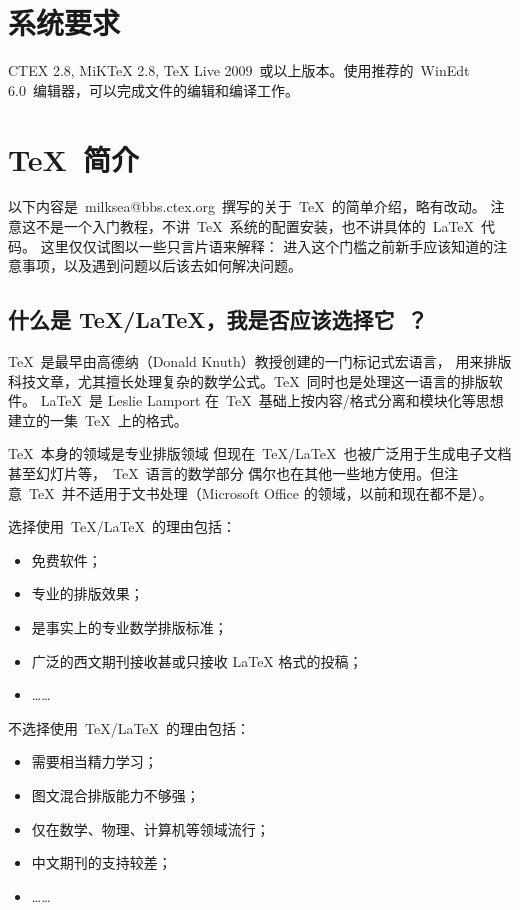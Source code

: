 \section{系统要求}
    CTEX 2.8, MiKTeX 2.8, TeX Live 2009~或以上版本。使用推荐的~WinEdt 6.0~编辑器，可以完成文件的编辑和编译工作。

\section{\TeX~简介}

以下内容是~milksea@bbs.ctex.org~撰写的关于~\TeX~的简单介绍，略有改动。
注意这不是一个入门教程，不讲~\TeX~系统的配置安装，也不讲具体的~\LaTeX~代码。
这里仅仅试图以一些只言片语来解释：
进入这个门槛之前新手应该知道的注意事项，以及遇到问题以后该去如何解决问题。

\subsection{什么是 \TeX/\LaTeX，我是否应该选择它~？}

\TeX~是最早由高德纳（Donald Knuth）教授创建的一门标记式宏语言，
用来排版科技文章，尤其擅长处理复杂的数学公式。\TeX~同时也是处理这一语言的排版软件。
\LaTeX~是 Leslie Lamport 在~\TeX~基础上按内容/格式分离和模块化等思想建立的一集~\TeX~上的格式。

\TeX~本身的领域是专业排版领域
但现在~TeX/LaTeX~也被广泛用于生成电子文档甚至幻灯片等，~\TeX~语言的数学部分
偶尔也在其他一些地方使用。但注意~\TeX~并不适用于文书处理（Microsoft Office 的领域，以前和现在都不是）。

选择使用~\TeX/\LaTeX~的理由包括：
\begin{itemize}
\item 免费软件；
\item 专业的排版效果；
\item 是事实上的专业数学排版标准；
\item 广泛的西文期刊接收甚或只接收 LaTeX 格式的投稿；
\item[] ……
\end{itemize}
不选择使用~\TeX/\LaTeX~的理由包括：
\begin{itemize}
\item 需要相当精力学习；
\item 图文混合排版能力不够强；
\item 仅在数学、物理、计算机等领域流行；
\item 中文期刊的支持较差；
\item[] ……
\end{itemize}

